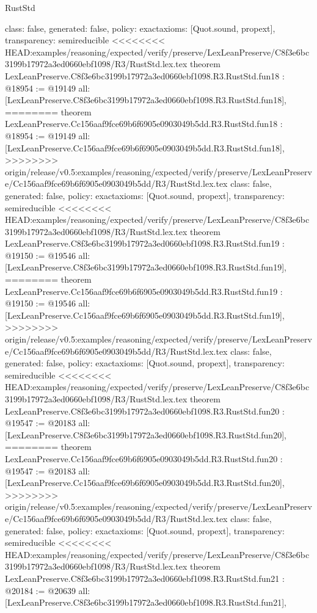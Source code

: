 \begin{lexlean}{RustStd}
\begin{coremodule}
{\begin{coremodule}
{{{{{{{{{{{{{{{{{{{{{  class: false,
  generated: false,
  policy: exact{axioms: [Quot.sound, propext]},
  transparency: semireducible
}
<<<<<<<< HEAD:examples/reasoning/expected/verify/preserve/LexLeanPreserve/C8f3e6bc3199b17972a3ed0660ebf1098/R3/RustStd.lex.tex
theorem LexLeanPreserve.C8f3e6bc3199b17972a3ed0660ebf1098.R3.RustStd.fun18 : @18954 := @19149 {
  all: [LexLeanPreserve.C8f3e6bc3199b17972a3ed0660ebf1098.R3.RustStd.fun18],
========
theorem LexLeanPreserve.Cc156aaf9fce69b6f6905e0903049b5dd.R3.RustStd.fun18 : @18954 := @19149 {
  all: [LexLeanPreserve.Cc156aaf9fce69b6f6905e0903049b5dd.R3.RustStd.fun18],
>>>>>>>> origin/release/v0.5:examples/reasoning/expected/verify/preserve/LexLeanPreserve/Cc156aaf9fce69b6f6905e0903049b5dd/R3/RustStd.lex.tex
  class: false,
  generated: false,
  policy: exact{axioms: [Quot.sound, propext]},
  transparency: semireducible
}
<<<<<<<< HEAD:examples/reasoning/expected/verify/preserve/LexLeanPreserve/C8f3e6bc3199b17972a3ed0660ebf1098/R3/RustStd.lex.tex
theorem LexLeanPreserve.C8f3e6bc3199b17972a3ed0660ebf1098.R3.RustStd.fun19 : @19150 := @19546 {
  all: [LexLeanPreserve.C8f3e6bc3199b17972a3ed0660ebf1098.R3.RustStd.fun19],
========
theorem LexLeanPreserve.Cc156aaf9fce69b6f6905e0903049b5dd.R3.RustStd.fun19 : @19150 := @19546 {
  all: [LexLeanPreserve.Cc156aaf9fce69b6f6905e0903049b5dd.R3.RustStd.fun19],
>>>>>>>> origin/release/v0.5:examples/reasoning/expected/verify/preserve/LexLeanPreserve/Cc156aaf9fce69b6f6905e0903049b5dd/R3/RustStd.lex.tex
  class: false,
  generated: false,
  policy: exact{axioms: [Quot.sound, propext]},
  transparency: semireducible
}
<<<<<<<< HEAD:examples/reasoning/expected/verify/preserve/LexLeanPreserve/C8f3e6bc3199b17972a3ed0660ebf1098/R3/RustStd.lex.tex
theorem LexLeanPreserve.C8f3e6bc3199b17972a3ed0660ebf1098.R3.RustStd.fun20 : @19547 := @20183 {
  all: [LexLeanPreserve.C8f3e6bc3199b17972a3ed0660ebf1098.R3.RustStd.fun20],
========
theorem LexLeanPreserve.Cc156aaf9fce69b6f6905e0903049b5dd.R3.RustStd.fun20 : @19547 := @20183 {
  all: [LexLeanPreserve.Cc156aaf9fce69b6f6905e0903049b5dd.R3.RustStd.fun20],
>>>>>>>> origin/release/v0.5:examples/reasoning/expected/verify/preserve/LexLeanPreserve/Cc156aaf9fce69b6f6905e0903049b5dd/R3/RustStd.lex.tex
  class: false,
  generated: false,
  policy: exact{axioms: [Quot.sound, propext]},
  transparency: semireducible
}
<<<<<<<< HEAD:examples/reasoning/expected/verify/preserve/LexLeanPreserve/C8f3e6bc3199b17972a3ed0660ebf1098/R3/RustStd.lex.tex
theorem LexLeanPreserve.C8f3e6bc3199b17972a3ed0660ebf1098.R3.RustStd.fun21 : @20184 := @20639 {
  all: [LexLeanPreserve.C8f3e6bc3199b17972a3ed0660ebf1098.R3.RustStd.fun21],
}}}}}}}}}}}}}}}}}}}}}}}}
\end{coremodule}}
\end{coremodule}
\end{lexlean}
